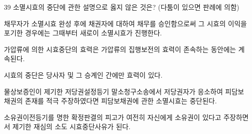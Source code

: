 \begin{question}{39}
소멸시효의 중단에 관한 설명으로 옳지 않은 것은? (다툼이 있으면 판례에 의함)
\begin{choices}
  \item 채무자가 소멸시효 완성 후에 채권자에 대하여 채무를 승인함으로써 그 시효의 이익을 포기한 경우에는 그때부터 새로이 소멸시효가 진행한다.
  \item 가압류에 의한 시효중단의 효력은 가압류의 집행보전의 효력이 존속하는 동안에는 계속된다.
  \item 시효의 중단은 당사자 및 그 승계인 간에만 효력이 있다.
  \item 물상보증인이 제기한 저당권설정등기 말소청구소송에서 저당권자가 응소하여 피담보채권의 존재를 적극 주장하였다면 피담보채권에 관한 소멸시효는 중단된다.
  \item 소유권이전등기를 명한 확정판결의 피고가 여전히 자신에게 소유권이 있다고 주장하면서 제기한 재심의 소도 시효중단사유가 된다.
\end{choices}
\end{question}
